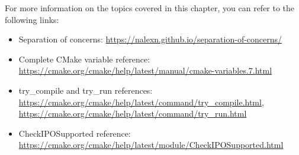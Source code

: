 For more information on the topics covered in this chapter, you can refer to the following links:

\begin{itemize}
\item
Separation of concerns: \url{https://nalexn.github.io/separation-of-concerns/}

\item
Complete CMake variable reference: \url{https://cmake.org/cmake/help/latest/manual/cmake-variables.7.html}

\item
try\_compile and try\_run references: \url{https://cmake.org/cmake/help/latest/command/try_compile.html}, \url{https://cmake.org/cmake/help/latest/command/try_run.html}

\item
CheckIPOSupported reference: \url{https://cmake.org/cmake/help/latest/module/CheckIPOSupported.html}
\end{itemize}















